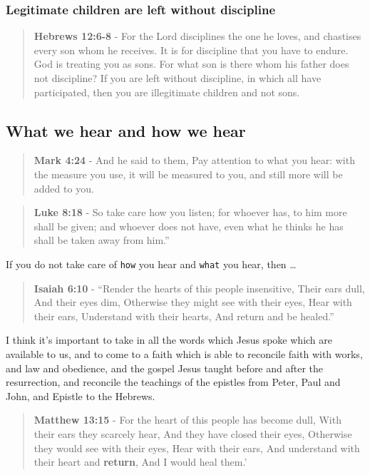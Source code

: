 \documentclass[11pt]{article}
\begin{document}
\subsubsection{Legitimate children are left without discipline}
\label{sec:orgefbcc3f}
\begin{quote}
\textbf{Hebrews 12:6-8} - For the Lord disciplines the one he loves, and chastises every son whom he receives. It is for discipline that you have to endure. God is treating you as sons. For what son is there whom his father does not discipline? If you are left without discipline, in which all have participated, then you are illegitimate children and not sons.
\end{quote}

\subsection{What we hear and how we hear}
\label{sec:org7f48fd9}
\begin{quote}
\textbf{Mark 4:24} - And he said to them, Pay attention to what you hear: with the measure you use, it will be measured to you, and still more will be added to you.
\end{quote}

\begin{quote}
\textbf{Luke 8:18} - So take care how you listen; for whoever has, to him more shall be given; and whoever does not have, even what he thinks he has shall be taken away from him.”
\end{quote}

If you do not take care of \texttt{how} you hear and \texttt{what} you hear, then \ldots{}

\begin{quote}
\textbf{Isaiah 6:10} - “Render the hearts of this people insensitive, Their ears dull, And their eyes dim, Otherwise they might see with their eyes, Hear with their ears, Understand with their hearts, And return and be healed.”
\end{quote}

I think it's important to take in all the words which Jesus spoke which are available to us, and to come to a faith which is able to reconcile faith with works, and law and obedience, and the gospel Jesus taught before and after the resurrection, and reconcile the teachings of the epistles from Peter, Paul and John, and Epistle to the Hebrews.

\begin{quote}
\textbf{Matthew 13:15} - For the heart of this people has become dull, With their ears they scarcely hear, And they have closed their eyes, Otherwise they would see with their eyes, Hear with their ears, And understand with their heart and \textbf{return}, And I would heal them.’
\end{quote}
\end{document}
